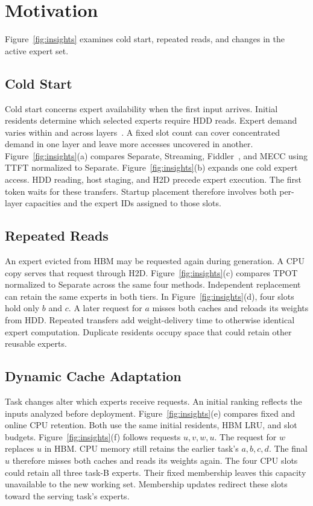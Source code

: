 \section{Motivation}
\label{sec:challenges}
Figure~\ref{fig:insights} examines cold start, repeated reads, and changes in the active expert set.

\subsection{Cold Start}
\label{sec:challenge_initial}
Cold start concerns expert availability when the first input arrives.
Initial residents determine which selected experts require HDD reads.
Expert demand varies within and across layers~\cite{routingconsistency}.
A fixed slot count can cover concentrated demand in one layer and leave more accesses uncovered in another.
Figure~\ref{fig:insights}(a) compares Separate, Streaming, Fiddler~\cite{fiddler}, and MECC using TTFT normalized to Separate.
Figure~\ref{fig:insights}(b) expands one cold expert access.
HDD reading, host staging, and H2D precede expert execution.
The first token waits for these transfers.
Startup placement therefore involves both per-layer capacities and the expert IDs assigned to those slots.

\subsection{Repeated Reads}
\label{sec:challenge_reuse}
An expert evicted from HBM may be requested again during generation.
A CPU copy serves that request through H2D.
Figure~\ref{fig:insights}(c) compares TPOT normalized to Separate across the same four methods.
Independent replacement can retain the same experts in both tiers.
In Figure~\ref{fig:insights}(d), four slots hold only $b$ and $c$.
A later request for $a$ misses both caches and reloads its weights from HDD.
Repeated transfers add weight-delivery time to otherwise identical expert computation.
Duplicate residents occupy space that could retain other reusable experts.

\subsection{Dynamic Cache Adaptation}
\label{sec:challenge_shift}
Task changes alter which experts receive requests.
An initial ranking reflects the inputs analyzed before deployment.
Figure~\ref{fig:insights}(e) compares fixed and online CPU retention.
Both use the same initial residents, HBM LRU, and slot budgets.
Figure~\ref{fig:insights}(f) follows requests $u,v,w,u$.
The request for $w$ replaces $u$ in HBM.
CPU memory still retains the earlier task's $a,b,c,d$.
The final $u$ therefore misses both caches and reads its weights again.
The four CPU slots could retain all three task-B experts.
Their fixed membership leaves this capacity unavailable to the new working set.
Membership updates redirect these slots toward the serving task's experts.
